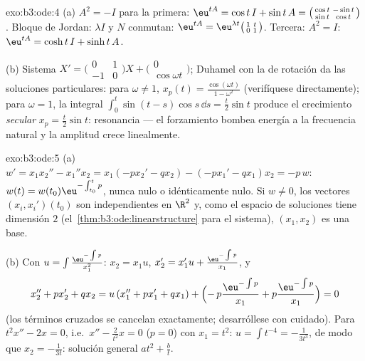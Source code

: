 \begin{solution}{exo:b3:ode:4}
(a) $A^2 = -I$ para la primera: $\eu^{tA} = \cos t\,I + \sin
t\,A = \bigl(\begin{smallmatrix}\cos t & -\sin t\\ \sin t &
\cos t\end{smallmatrix}\bigr)$. Bloque de Jordan: $\lambda I$ y $N$
conmutan: $\eu^{tA} =
\eu^{\lambda t}\bigl(\begin{smallmatrix}1 & t\\ 0 &
1\end{smallmatrix}\bigr)$. Tercera: $A^2 = I$: $\eu^{tA} =
\cosh t\,I + \sinh t\,A$.

(b) Sistema $X' = \bigl(\begin{smallmatrix}0&1\\-1&0
\end{smallmatrix}\bigr)X + \bigl(\begin{smallmatrix}0\\
\cos\omega t\end{smallmatrix}\bigr)$; Duhamel con la
 de rotación da las
soluciones particulares: para $\omega \neq 1$,
$x_p(t) = \frac{\cos(\omega t)}{1 -
\omega^2}$ (verifíquese directamente); para $\omega = 1$, la integral
$\int_0^t\sin(t - s)\cos s\,\dd s = \frac t2\sin t$ produce el
crecimiento \emph{secular} $x_p = \frac t2\sin t$: resonancia --- el
forzamiento bombea energía a la frecuencia natural y la amplitud crece
linealmente.
\end{solution}

\begin{solution}{exo:b3:ode:5}
(a) $w' = x_1x_2'' - x_1''x_2 = x_1(-px_2' - qx_2) - (-px_1'
- qx_1)x_2 = -p\,w$: $w(t) = w(t_0)\eu^{-\int_{t_0}^tp}$,
nunca nulo o idénticamente nulo. Si $w \neq 0$, los vectores
$(x_i, x_i')(t_0)$ son independientes en $\R^2$ y, como el espacio de
soluciones tiene dimensión $2$ (el~\cref{thm:b3:ode:linearstructure}
para el sistema), $(x_1,
x_2)$ es una base.

(b) Con $u = \int\frac{\eu^{-\int p}}{x_1^2}$: $x_2 = x_1u$,
$x_2' = x_1'u + \frac{\eu^{-\int p}}{x_1}$, y
\[
x_2'' + px_2' + qx_2
= u\,(x_1'' + px_1' + qx_1) +
\Bigl(-\,p\frac{\eu^{-\int p}}{x_1} +
p\frac{\eu^{-\int p}}{x_1}\Bigr) = 0
\]
(los términos cruzados se cancelan exactamente; desarróllese con
cuidado). Para
$t^2x'' - 2x = 0$, i.e.\ $x'' - \frac2{t^2}x = 0$ ($p = 0$)
con $x_1 = t^2$: $u = \int t^{-4} = -\frac1{3t^3}$, de modo que $x_2
= -\frac1{3t}$: solución general $at^2 + \frac bt$.
\end{solution}

